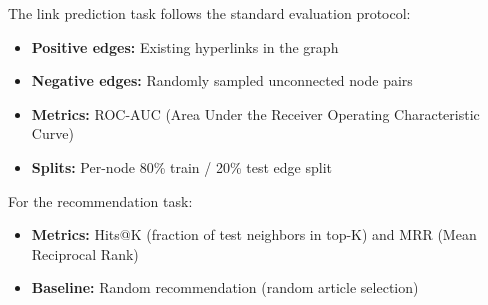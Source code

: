 The link prediction task follows the standard evaluation protocol:

\begin{itemize}
    \item \textbf{Positive edges:} Existing hyperlinks in the graph
    \item \textbf{Negative edges:} Randomly sampled unconnected node pairs
    \item \textbf{Metrics:} ROC-AUC (Area Under the Receiver Operating Characteristic Curve)
    \item \textbf{Splits:} Per-node 80\% train / 20\% test edge split
\end{itemize}

For the recommendation task:

\begin{itemize}
    \item \textbf{Metrics:} Hits@K (fraction of test neighbors in top-K) and MRR (Mean Reciprocal Rank)
    \item \textbf{Baseline:} Random recommendation (random article selection)
\end{itemize}
